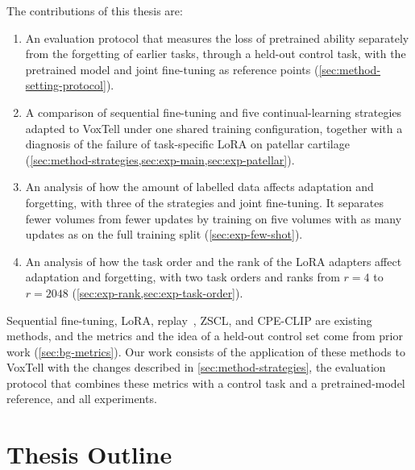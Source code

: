 The contributions of this thesis are:
\begin{enumerate}
  \item An evaluation protocol that measures the loss of pretrained ability separately from the forgetting of earlier tasks, through a held-out control task, with the pretrained model and joint fine-tuning as reference points (\cref{sec:method-setting-protocol}).
  \item A comparison of sequential fine-tuning and five continual-learning strategies adapted to VoxTell under one shared training configuration, together with a diagnosis of the failure of task-specific LoRA on patellar cartilage (\cref{sec:method-strategies,sec:exp-main,sec:exp-patellar}).
  \item An analysis of how the amount of labelled data affects adaptation and forgetting, with three of the strategies and joint fine-tuning. It separates fewer volumes from fewer updates by training on five volumes with as many updates as on the full training split (\cref{sec:exp-few-shot}).
  \item An analysis of how the task order and the rank of the LoRA adapters affect adaptation and forgetting, with two task orders and ranks from $r = 4$ to $r = 2048$ (\cref{sec:exp-rank,sec:exp-task-order}).
\end{enumerate}

Sequential fine-tuning, LoRA, replay~\cite[Sec.~3.1]{delange2022}, ZSCL, and CPE-CLIP are existing methods, and the metrics and the idea of a held-out control set come from prior work (\cref{sec:bg-metrics}).
Our work consists of the application of these methods to VoxTell with the changes described in \cref{sec:method-strategies}, the evaluation protocol that combines these metrics with a control task and a pretrained-model reference, and all experiments.

\section{Thesis Outline}
\label{sec:intro-outline}

